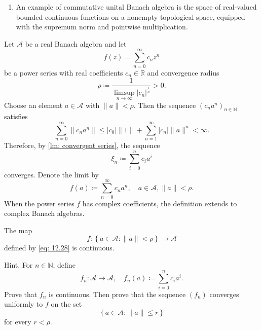 \begin{eg}
\begin{enumerate}
        Therefore, the group of invertible elements of \(\mathcal{L} (X)\) is exactly the group of bounded linear isomorphisms of \(X\).

        \item An example of commutative unital Banach algebra is the space of real-valued bounded continuous functions on a nonempty topological space, equipped with the supremum norm and pointwise multiplication. 
    \end{enumerate}
\end{eg}

Let \(\mathcal{A} \) be a real Banach algebra and let 
\[
    f(z) = \sum_{n=0}^{\infty} c_n z^n 
\] 
be a power series with real coefficients \(c_n \in \mathbb{R}\) and convergence radius 
\[
    \rho \coloneqq \frac{1}{\limsup_{n \to \infty} \vert c_n \vert^{\frac{1}{n}}  } > 0.
\] 
Choose an element \(a \in \mathcal{A}\) with \(\lVert a \rVert < \rho \). Then the sequence \((c_n a^n)_{n \in \mathbb{N}}\) satisfies 
\[
    \sum_{n=0}^{\infty} \lVert c_n a^n \rVert \le \vert c_0 \vert \lVert 1 \rVert + \sum_{n=1}^{\infty} \vert c_n \vert \lVert a \rVert^n < \infty.     
\]   
Therefore, by \autoref{lm: convergent series}, the sequence 
\[
    \xi _n \coloneqq \sum_{i=0}^n c_i a^i 
\] 
converges. Denote the limit by
\begin{equation} \label{eq: 12.28}
    f(a) \coloneqq \sum_{n=0}^{\infty} c_n a^n, \quad a \in \mathcal{A}, \lVert a \rVert < \rho. 
\end{equation} 
When the power series \(f\) has complex coefficients, the definition extends to complex Banach algebras. 

\begin{exercise}
    The map 
    \[
        f : \left\{ a \in \mathcal{A} : \lVert a \rVert < \rho  \right\} \to \mathcal{A} 
    \]
    defined by \autoref{eq: 12.28} is continuous. 

    Hint. For \(n \in \mathbb{N}\), define 
    \[
        f_n : \mathcal{A} \to \mathcal{A}, \quad f_n (a) \coloneqq \sum_{i=0}^n c_i a^i. 
    \] 
    Prove that \(f_n\) is continuous. Then prove that the sequence \((f_n)\) converges uniformly to \(f\) on the set 
    \[
        \left\{ a \in \mathcal{A} : \lVert a \rVert \le r  \right\} 
    \] 
    for every \(r < \rho \). 
\end{exercise}

